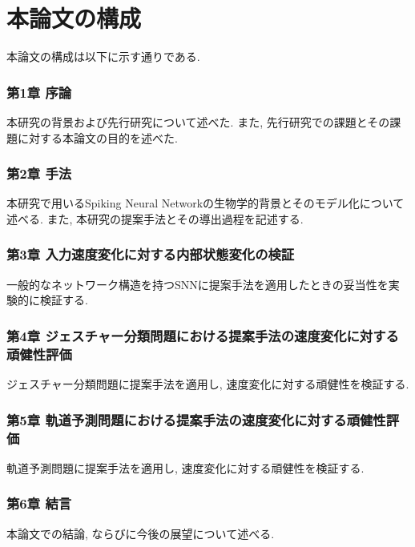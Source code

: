 \section{本論文の構成}
本論文の構成は以下に示す通りである.

\subsubsection{第1章 序論}
本研究の背景および先行研究について述べた.
また, 先行研究での課題とその課題に対する本論文の目的を述べた.

\subsubsection{第2章 手法}
本研究で用いるSpiking Neural Networkの生物学的背景とそのモデル化について述べる.
また, 本研究の提案手法とその導出過程を記述する.

\subsubsection{第3章 入力速度変化に対する内部状態変化の検証}
一般的なネットワーク構造を持つSNNに提案手法を適用したときの妥当性を実験的に検証する.

\subsubsection{第4章 ジェスチャー分類問題における提案手法の速度変化に対する頑健性評価}
ジェスチャー分類問題に提案手法を適用し, 速度変化に対する頑健性を検証する.

\subsubsection{第5章 軌道予測問題における提案手法の速度変化に対する頑健性評価}
軌道予測問題に提案手法を適用し, 速度変化に対する頑健性を検証する.

\subsubsection{第6章 結言}
本論文での結論, ならびに今後の展望について述べる.
